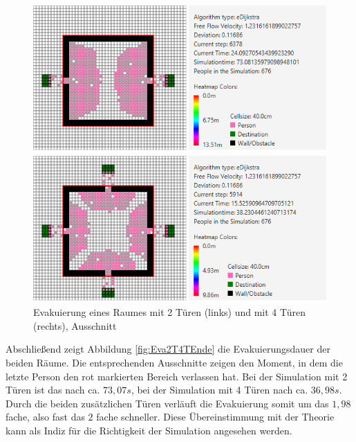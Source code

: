 \begin{figure}[!htb]
	\centering
	\begin{minipage}{.5\textwidth}
		\centering
		\includegraphics[width=\textwidth]{abbildungen/Evak2TuerenMitte.png}
	\end{minipage}%
	\begin{minipage}{0.5\textwidth}
		\centering
		\includegraphics[width=\textwidth]{abbildungen/Evak4TuerenMitte.png}
	\end{minipage}
	\caption{Evakuierung eines Raumes mit 2 Türen (links) und mit 4 Türen (rechts), Ausschnitt}
	\label{fig:Eva2T4TMitte}
\end{figure}

Abschließend zeigt Abbildung \ref{fig:Eva2T4TEnde} die Evakuierungsdauer der beiden Räume. Die entsprechenden Ausschnitte zeigen den Moment, in dem die letzte Person den rot markierten Bereich verlassen hat. Bei der Simulation mit 2 Türen ist das nach ca. $73,07s$, bei der Simulation mit 4 Türen nach ca. $36,98s$. Durch die beiden zusätzlichen Türen verläuft die Evakuierung somit um das $1,98$ fache, also fast das $2$ fache schneller. Diese Übereinstimmung mit der Theorie kann als Indiz für die Richtigkeit der Simulation angesehen werden. \\

